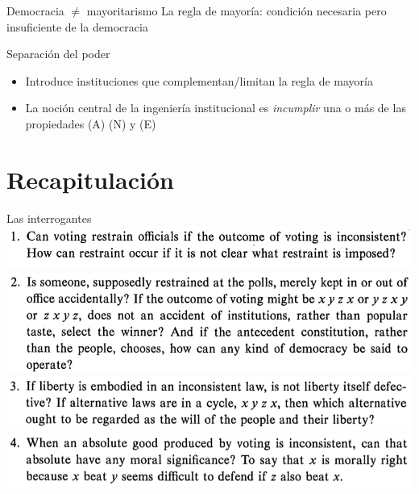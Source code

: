 \documentclass[bigger]{beamer}
\begin{document}
\begin{frame}[label={sec:org9dfd0df}]{Democracia \(\neq\) mayoritarismo}
La regla de mayoría: condición necesaria pero \alert{insuficiente} de la democracia

\pause \bigskip
\begin{block}{Separación del poder}
\begin{itemize}
\item Introduce instituciones que complementan/limitan la regla de mayoría
\item La noción central de la ingeniería institucional es \emph{incumplir} una o más de las propiedades (A) (N) y (E)
\end{itemize}
\end{block}
\end{frame}

\section{Recapitulación}
\label{sec:orgd8dc25e}
\begin{frame}[label={sec:orga28f3d9}]{Las interrogantes}
\centering
\includegraphics[width=\textwidth]{./pics/rk8.png} \\[0pt]

\includegraphics[width=\textwidth]{./pics/rk9.png} \\[0pt]

\includegraphics[width=\textwidth]{./pics/rk10.png} \\[0pt]

\includegraphics[width=\textwidth]{./pics/rk11.png}
\end{frame}
\end{document}
